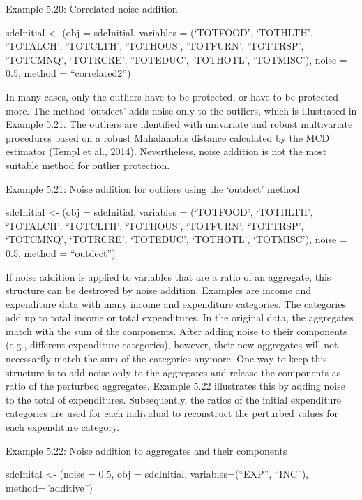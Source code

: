 \documentclass[letterpaper,10pt,english]{sphinxmanual}
\begin{document}
Example 5.20: Correlated noise addition

sdcInitial \textless{}- (obj = sdcInitial, variables =
(‘TOTFOOD’, ‘TOTHLTH’, ‘TOTALCH’, ‘TOTCLTH’, ‘TOTHOUS’,
‘TOTFURN’, ‘TOTTRSP’, ‘TOTCMNQ’, ‘TOTRCRE’, ‘TOTEDUC’, ‘TOTHOTL’,
‘TOTMISC’), noise = 0.5, method = “correlated2”)

In many cases, only the outliers have to be protected, or have to be
protected more. The method ‘outdect’ adds noise only to the outliers,
which is illustrated in Example 5.21. The outliers are identified with
univariate and robust multivariate procedures based on a robust
Mahalanobis distance calculated by the MCD estimator (Templ et al.,
2014). Nevertheless, noise addition is not the most suitable method for
outlier protection.

Example 5.21: Noise addition for outliers using the ‘outdect’ method

sdcInitial \textless{}- (obj = sdcInitial, variables =
(‘TOTFOOD’, ‘TOTHLTH’, ‘TOTALCH’, ‘TOTCLTH’, ‘TOTHOUS’,
‘TOTFURN’, ‘TOTTRSP’, ‘TOTCMNQ’, ‘TOTRCRE’, ‘TOTEDUC’, ‘TOTHOTL’,
‘TOTMISC’), noise = 0.5, method = “outdect”)

If noise addition is applied to variables that are a ratio of an
aggregate, this structure can be destroyed by noise addition. Examples
are income and expenditure data with many income and expenditure
categories. The categories add up to total income or total expenditures.
In the original data, the aggregates match with the sum of the
components. After adding noise to their components (e.g., different
expenditure categories), however, their new aggregates will not
necessarily match the sum of the categories anymore. One way to keep
this structure is to add noise only to the aggregates and release the
components as ratio of the perturbed aggregates. Example 5.22
illustrates this by adding noise to the total of expenditures.
Subsequently, the ratios of the initial expenditure categories are used
for each individual to reconstruct the perturbed values for each
expenditure category.

Example 5.22: Noise addition to aggregates and their components

\begin{DUlineblock}{0em}
\item[] 
\item[] sdcInital \textless{}- (noise = 0.5, obj = sdcInitial,
variables=(“EXP”, “INC”), method=”additive”)
\end{DUlineblock}
\end{document}
